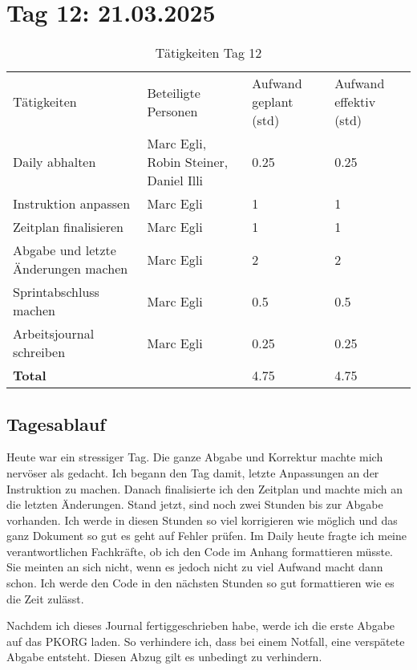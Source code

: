 \section{Tag 12: 21.03.2025}
\begin{table}[H]
    \begin{tabular}{|L{0.4\textwidth}|C{60pt}|C{60pt}|C{60pt}|}
        \hline
        \color{white}Tätigkeiten & \color{white}Beteiligte \color{white}Personen & \color{white}Aufwand geplant (std) & \color{white}Aufwand effektiv (std) \\
        Daily abhalten & Marc Egli, Robin Steiner, Daniel Illi & 0.25 & 0.25 \\
        \hline
        Instruktion anpassen & Marc Egli & 1 & 1 \\
        \hline
        Zeitplan finalisieren & Marc Egli & 1 & 1 \\
        \hline  
        Abgabe und letzte Änderungen machen & Marc Egli & 2 & 2 \\
        \hline
        Sprintabschluss machen & Marc Egli & 0.5 & 0.5 \\ 
        \hline
        Arbeitsjournal schreiben & Marc Egli & 0.25 & 0.25 \\
        \hline
        \textbf{Total} &  & 4.75 & 4.75 \\
        \hline
    \end{tabular}
    \caption{Tätigkeiten Tag 12}
\end{table}

\subsection*{Tagesablauf}

Heute war ein stressiger Tag. Die ganze Abgabe und Korrektur machte mich nervöser als gedacht. Ich begann den Tag damit, letzte Anpassungen an der Instruktion zu machen.
Danach finalisierte ich den Zeitplan und machte mich an die letzten Änderungen. Stand jetzt, sind noch zwei Stunden bis zur Abgabe vorhanden. Ich werde in diesen 
Stunden so viel korrigieren wie möglich und das ganz Dokument so gut es geht auf Fehler prüfen. Im Daily heute fragte ich meine verantwortlichen Fachkräfte, ob 
ich den Code im Anhang formattieren müsste. Sie meinten an sich nicht, wenn es jedoch nicht zu viel Aufwand macht dann schon. Ich werde den Code in den nächsten Stunden 
so gut formattieren wie es die Zeit zulässt.

Nachdem ich dieses Journal fertiggeschrieben habe, werde ich die erste Abgabe auf das PKORG laden. So verhindere ich, dass bei einem Notfall, eine verspätete Abgabe entsteht. 
Diesen Abzug gilt es unbedingt zu verhindern. 

